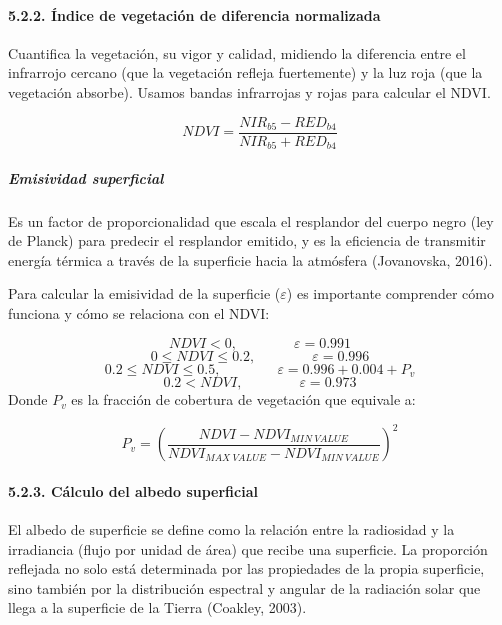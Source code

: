 \documentclass[
]{article}
\begin{document}
\hypertarget{uxedndice-de-vegetaciuxf3n-de-diferencia-normalizada}{%
\paragraph{5.2.2. Índice de vegetación de diferencia
normalizada}\label{uxedndice-de-vegetaciuxf3n-de-diferencia-normalizada}}

Cuantifica la vegetación, su vigor y calidad, midiendo la diferencia
entre el infrarrojo cercano (que la vegetación refleja fuertemente) y la
luz roja (que la vegetación absorbe). Usamos bandas infrarrojas y rojas
para calcular el NDVI.

\[ NDVI = \frac{NIR_{b5}-RED_{b4}}{NIR_{b5}+RED_{b4}}\]

\hypertarget{emisividad-superficial}{%
\subparagraph{\texorpdfstring{\emph{Emisividad
superficial}}{Emisividad superficial}}\label{emisividad-superficial}}

Es un factor de proporcionalidad que escala el resplandor del cuerpo
negro (ley de Planck) para predecir el resplandor emitido, y es la
eficiencia de transmitir energía térmica a través de la superficie hacia
la atmósfera (Jovanovska, 2016).

Para calcular la emisividad de la superficie (\(\varepsilon\)) es
importante comprender cómo funciona y cómo se relaciona con el NDVI:

\[NDVI < 0, \hspace{4em} \varepsilon = 0.991\]
\[0 \le NDVI \le 0.2, \hspace{4em} \varepsilon = 0.996\]
\[0.2 \le NDVI \le 0.5, \hspace{4em} \varepsilon = 0.996 + 0.004 + P_{v}\]
\[0.2 < NDVI, \hspace{4em} \varepsilon = 0.973\] Donde \(P_{v}\) es la
fracción de cobertura de vegetación que equivale a:

\[ P_{v} = (\frac{NDVI-NDVI_{MIN \ VALUE}}{NDVI_{MAX \ VALUE} -NDVI_{MIN \ VALUE}})^2\]

\hypertarget{cuxe1lculo-del-albedo-superficial}{%
\paragraph{5.2.3. Cálculo del albedo
superficial}\label{cuxe1lculo-del-albedo-superficial}}

El albedo de superficie se define como la relación entre la radiosidad y
la irradiancia (flujo por unidad de área) que recibe una superficie. La
proporción reflejada no solo está determinada por las propiedades de la
propia superficie, sino también por la distribución espectral y angular
de la radiación solar que llega a la superficie de la Tierra (Coakley,
2003).
\end{document}
